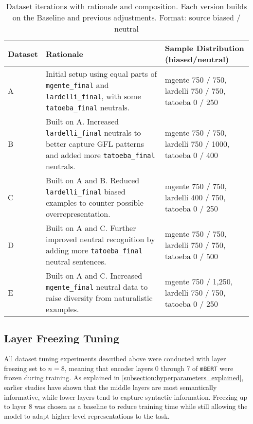 \vspace{0.8em}
\begin{table}[ht]
    \centering
        \begin{tabularx}{\textwidth}{l X >{\raggedright\arraybackslash}X}
    \toprule
    \textbf{Dataset} & \textbf{Rationale} & \textbf{Sample Distribution (biased/neutral)} \\
    \midrule
    A & Initial setup using equal parts of \texttt{mgente\_final} and \texttt{lardelli\_final}, with some \texttt{tatoeba\_final} neutrals. & mgente 750 / 750, lardelli 750 / 750, tatoeba 0 / 250 \\
    B & Built on A. Increased \texttt{lardelli\_final} neutrals to better capture GFL patterns and added more \texttt{tatoeba\_final} neutrals. & mgente 750 / 750, lardelli 750 / 1000, tatoeba 0 / 400 \\
    C & Built on A and B. Reduced \texttt{lardelli\_final} biased examples to counter possible overrepresentation. & mgente 750 / 750, lardelli 400 / 750, tatoeba 0 / 250 \\
    D & Built on A and C. Further improved neutral recognition by adding more \texttt{tatoeba\_final} neutral sentences. & mgente 750 / 750, lardelli 750 / 750, tatoeba 0 / 500 \\
    E & Built on A and C. Increased \texttt{mgente\_final} neutral data to raise diversity from naturalistic examples. & mgente 750 / 1,250, lardelli 750 / 750, tatoeba 0 / 250 \\
    \bottomrule
    \end{tabularx}
    \caption[Dataset iterations with rationale and composition]{Dataset iterations with rationale and composition. Each version builds on the Baseline and previous adjustments. Format: source biased / neutral}
    \label{tab:dataset_versions}
\end{table}


\subsection{Layer Freezing Tuning}
    All dataset tuning experiments described above were conducted with layer freezing set to $n=8$, meaning that encoder layers 0 through 7 of \texttt{mBERT} were frozen during training. As explained in \autoref{subsection:hyperparameters_explained}, earlier studies have shown that the middle layers are most semantically informative, while lower layers tend to capture syntactic information. Freezing up to layer 8 was chosen as a baseline to reduce training time while still allowing the model to adapt higher-level representations to the task.


